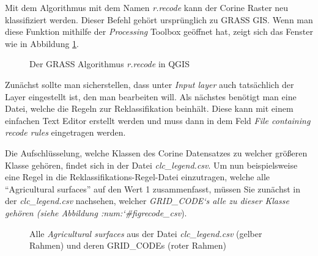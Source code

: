 \documentclass[a4paper,12pt,ngerman]{sphinxmanual}
\begin{document}
Mit dem Algorithmus mit dem Namen \emph{r.recode} kann der Corine Raster neu klassifiziert werden. Dieser Befehl gehört ursprünglich zu GRASS GIS.
Wenn man diese Funktion mithilfe der \emph{Processing} Toolbox geöffnet hat, zeigt sich das Fenster wie in Abbildung \hyperref[uebung3:figrecode]{ \ref*{uebung3:figrecode}}.
\begin{figure}[htbp]
\centering
\capstart

\caption{Der GRASS Algorithmus \emph{r.recode} in QGIS}\label{uebung3:figrecode}\end{figure}

Zunächst sollte man sicherstellen, dass unter \emph{Input layer} auch tatsächlich der Layer eingestellt ist, den man bearbeiten will. Als nächstes benötigt man eine Datei, welche die Regeln zur Reklassifikation beinhält. Diese kann mit einem einfachen Text Editor erstellt werden und muss dann in dem Feld \emph{File containing recode rules} eingetragen werden.

Die Aufschlüsselung, welche Klassen des Corine Datensatzes zu welcher größeren Klasse gehören, findet sich in der Datei \emph{clc\_legend.csv}.
Um nun beispielsweise eine Regel in die Reklassifikations-Regel-Datei einzutragen, welche alle ``Agricultural surfaces'' auf den Wert 1 zusammenfasst, müssen Sie zunächst in der \emph{clc\_legend.csv} nachsehen, welcher \emph{GRID\_CODE{}`s alle zu dieser Klasse gehören (siehe Abbildung :num:{}`\#figrecode\_csv}).
\begin{figure}[htbp]
\centering
\capstart

\caption{Alle \emph{Agricultural surfaces} aus der Datei \emph{clc\_legend.csv} (gelber Rahmen) und deren GRID\_CODEs (roter Rahmen)}\label{uebung3:figrecode-csv}\end{figure}
\end{document}
